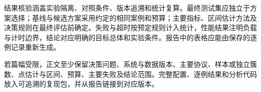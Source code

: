 \documentclass[../workbook.tex]{subfiles}
\begin{document}
结果核验涵盖实验隔离、对照条件、版本追溯和统计复算。最终测试集应独立于方案选择；基线与候选方案采用约定的相同案例和预算；主要指标、区间估计方法及决策规则在最终评估前确定。失败与超时按预定规则计入统计，性能结果注明负载与计时边界，结论对应明确的目标总体和实验条件。报告中的表格应能由保存的逐例记录重新生成。

\begin{note}[最小充分报告]
若篇幅受限，正文至少保留决策问题、系统与数据版本、主要协议、样本或独立簇数、点估计与区间、预算、主要失败及结论范围。完整配置、逐例结果和分析代码放入可追溯的复现包，并从报告链接到对应版本。
\end{note}

\chapterreferences
\myendchapterdocument
\end{document}
